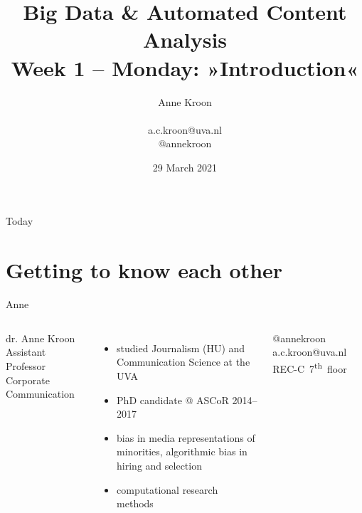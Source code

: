 \documentclass[handout]{beamer}
\title[Big Data and Automated Content Analysis]{\textbf{Big Data \& Automated Content Analysis} \\ Week 1 -- Monday: »Introduction«}
\author[Anne Kroon]{Anne Kroon \\ ~ \\ \footnotesize{a.c.kroon@uva.nl \\@annekroon} }
\date{29 March 2021}
\institute[UvA]{Afdeling Communicatiewetenschap \\Universiteit van Amsterdam}
\begin{document}
\begin{frame}{}
\titlepage
\end{frame}

\begin{frame}{Today}
\tableofcontents
\end{frame}


\section{Getting to know each other}

\begin{frame}{Anne}

	\begin{columns}
		dr. Anne Kroon \\
        Assistant Professor Corporate Communication \\
		\begin{itemize}
			\item studied Journalism (HU) and Communication Science at the UVA 
			\item PhD candidate @ ASCoR 2014--2017
			\item bias in media representations of minorities, algorithmic bias in hiring and selection 
			\item computational research methods
		\end{itemize}
		@annekroon ~~ a.c.kroon@uva.nl ~~ REC-C~7\textsuperscript{th}~floor 
	\end{columns}
\end{frame}
\end{document}
